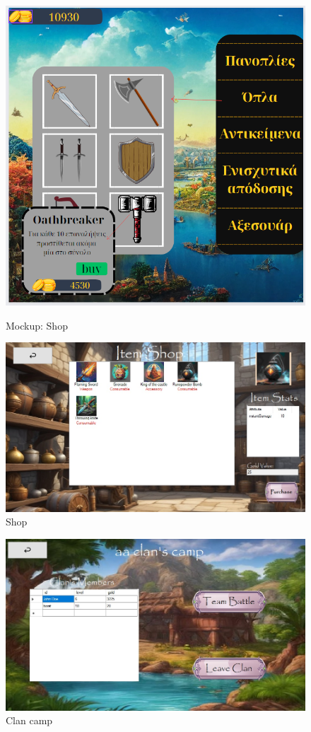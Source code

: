 \begin{figure}[h]
    \centering
    \begin{minipage}[b]{0.45\textwidth}
        \centering
    \includegraphics[width=\textwidth]{omockup8.jpg}
    \caption{Mockup: {Shop}}
    \end{minipage}
    \hfill
    \begin{minipage}[b]{0.45\textwidth}
        \centering
    \includegraphics[width=\textwidth]{mockup8.jpg}
    \caption{Shop}
    \end{minipage}
\end{figure}


	
\begin{figure}[!htb]
  \centering
    \centering
    \includegraphics[width=\textwidth]{mockup9.jpg}
    \caption{Clan camp}
    \label{}
\end{figure}